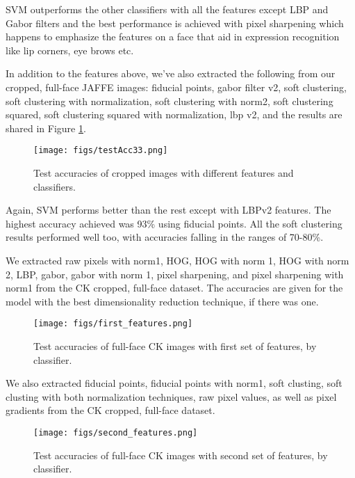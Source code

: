 \documentclass[10pt,twocolumn,letterpaper]{article}
\begin{document}
SVM outperforms the other classifiers with all the features except LBP and Gabor filters and the best performance is achieved with pixel sharpening which happens to emphasize the features on a face that aid in expression recognition like lip corners, eye brows etc.

In addition to the features above, we've also extracted the following from our cropped, full-face JAFFE images: fiducial points, gabor filter v2, soft clustering, soft clustering with normalization, soft clustering with norm2, soft clustering squared, soft clustering squared with normalization, lbp v2, and the results are shared in Figure \ref{fig:testacc3}. 

\begin{figure}[h]
\texttt{[image: figs/testAcc33.png]}
\caption{Test accuracies of cropped images with different features and classifiers.}
\label{fig:testacc3}
\end{figure}

Again, SVM performs better than the rest except with LBPv2 features. The highest accuracy achieved was 93\% using fiducial points. All the soft clustering results performed well too, with accuracies falling in the ranges of 70-80\%.

We extracted raw pixels with norm1, HOG, HOG with norm 1, HOG with norm 2, LBP, gabor, gabor with norm 1, pixel sharpening, and pixel sharpening with norm1 from the CK cropped, full-face dataset. The accuracies are given for the model with the best dimensionality reduction technique, if there was one.

\begin{figure}[h]
\texttt{[image: figs/first\_features.png]}
\caption{Test accuracies of full-face CK images with first set of features, by classifier.}
\label{fig:testck1}
\end{figure}

We also extracted fiducial points, fiducial points with norm1, soft clusting, soft clusting with both normalization techniques, raw pixel values, as well as pixel gradients from the CK cropped, full-face dataset.

\begin{figure}[h]
\texttt{[image: figs/second\_features.png]}
\caption{Test accuracies of full-face CK images with second set of features, by classifier.}
\label{fig:testck2}
\end{figure}
\end{document}
